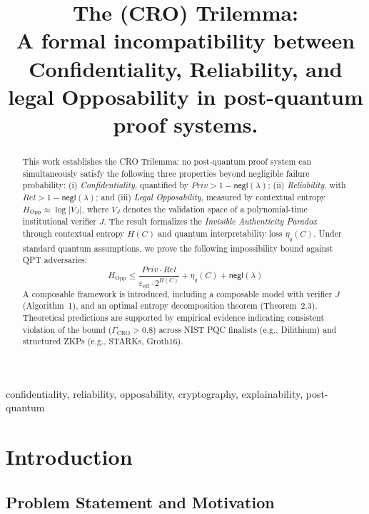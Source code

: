 \documentclass[preprint,12pt]{elsarticle}
\begin{document}
    \begin{frontmatter}

        \title{The (CRO) Trilemma:\\ A formal incompatibility between Confidentiality, Reliability, and legal Opposability in post-quantum proof systems.}
        
        \begin{abstract}
            This work establishes the CRO Trilemma: no post-quantum proof system can simultaneously satisfy the following three properties beyond negligible failure probability: (i) \emph{Confidentiality}, quantified by $Priv > 1 - \mathsf{negl}(\lambda)$; (ii) \emph{Reliability}, with $Rel > 1 - \mathsf{negl}(\lambda)$; and (iii) \emph{Legal Opposability}, measured by contextual entropy $H_{\text{Opp}} \approx \log |V_J|$, where $V_J$ denotes the validation space of a polynomial-time institutional verifier $J$.
            The result formalizes the \emph{Invisible Authenticity Paradox} through contextual entropy $H(C)$ and quantum interpretability loss $\eta_q(C)$. Under standard quantum assumptions, we prove the following impossibility bound against QPT adversaries:
            \[
            H_{\text{Opp}} \leq \frac{Priv \cdot Rel}{\varepsilon_{\text{eff}} \cdot 2^{H(C)}} + \eta_q(C) + \mathsf{negl}(\lambda)
            \]
            A composable framework is introduced, including a composable model with verifier $J$ (Algorithm~1), and an optimal entropy decomposition theorem (Theorem~2.3). Theoretical predictions are supported by empirical evidence indicating consistent violation of the bound ($\Gamma_{\text{CRO}} > 0.8$) across NIST PQC finalists (e.g., Dilithium) and structured ZKPs (e.g., STARKs, Groth16).
        \end{abstract}


        \begin{keyword}
            confidentiality, reliability, opposability, cryptography, explainability, post-quantum
        \end{keyword}
    \end{frontmatter}

    \section{Introduction}\label{sec:introduction}

        \subsection{Problem Statement and Motivation}
\end{document}
